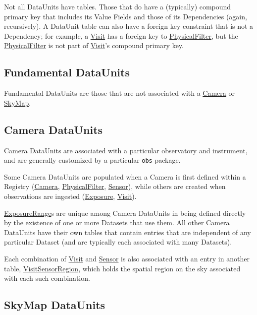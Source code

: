 \documentclass[DM,toc]{lsstdoc}
\newcommand{\tblref}[1]{\hyperref[tbl:#1]{#1}}
\newcommand{\unitref}[1]{\hyperref[unit:#1]{#1}}
\newcommand{\unitinc}[1]{}
\begin{document}
Not all DataUnits have tables.
Those that do have a (typically) compound primary key that includes its Value Fields and those of its Dependencies (again, recursively).
A DataUnit table can also have a foreign key constraint that is not a Dependency; for example, a \unitref{Visit} has a foreign key to \unitref{PhysicalFilter}, but the \unitref{PhysicalFilter} is not part of \unitref{Visit}'s compound primary key.

\subsection{Fundamental DataUnits}
\label{sec:fundamental-dataunits}

Fundamental DataUnits are those that are not associated with a \unitref{Camera} or \unitref{SkyMap}.

\unitinc{Label}
\unitinc{AbstractFilter}
\unitinc{SkyPix}

\subsection{Camera DataUnits}
\label{sec:camera-dataunits}

Camera DataUnits are associated with a particular observatory and instrument, and are generally customized by a particular \texttt{obs} package.

Some Camera DataUnits are populated when a Camera is first defined within a Registry (\unitref{Camera}, \unitref{PhysicalFilter}, \unitref{Sensor}), while others are created when observations are ingested (\unitref{Exposure}, \unitref{Visit}).

\unitref{ExposureRange}s are unique among Camera DataUnits in being defined directly by the existence of one or more Datasets that use them.
All other Camera DataUnits have their own tables that contain entries that are independent of any particular Dataset (and are typically each associated with many Datasets).

Each combination of \unitref{Visit} and \unitref{Sensor} is also associated with an entry in another table, \tblref{VisitSensorRegion}, which holds the spatial region on the sky associated with each such combination.

\unitinc{Camera}
\unitinc{PhysicalFilter}
\unitinc{Sensor}
\unitinc{Exposure}
\unitinc{Visit}
\unitinc{ExposureRange}

\subsection{SkyMap DataUnits}
\label{sec:skymap-dataunits}
\end{document}
